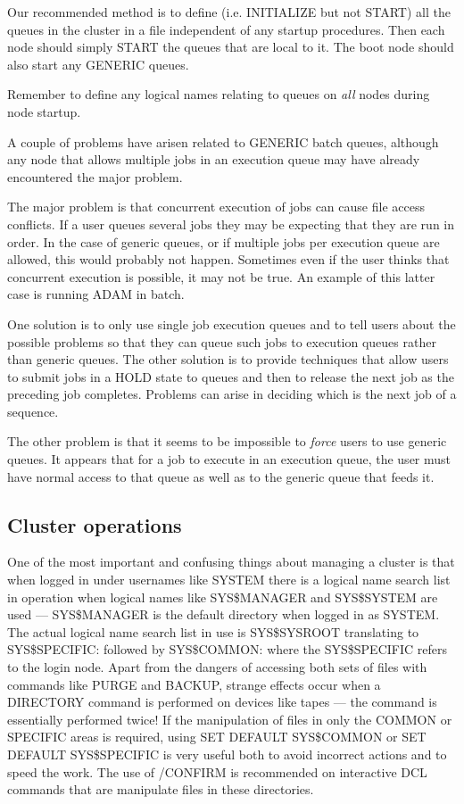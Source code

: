 Our recommended method is to define (i.e. INITIALIZE but not START) all the
queues in the cluster in a file independent of any startup procedures.
Then each node should simply START the queues that are local to it.
The boot node should also start any GENERIC queues.

Remember to define any logical names relating to queues on {\em all} nodes
during node startup.

A couple of problems have arisen related to GENERIC batch queues, although
any node that allows multiple jobs in an execution queue may have already
encountered the major problem.

The major problem is that concurrent execution of jobs can cause file access
conflicts.
If a user queues several jobs they may be expecting that they are run in order.
In the case of generic queues, or if multiple jobs per execution queue are
allowed, this would probably not happen.
Sometimes even if the user thinks that concurrent execution is possible, it
may not be true.
An example of this latter case is running ADAM in batch.

One solution is to only use single job execution queues and to tell users
about the possible problems so that they can queue such jobs to execution
queues rather than generic queues.
The other solution is to provide techniques that allow users to submit jobs
in a HOLD state to queues and then to release the next job as the preceding
job completes.
Problems can arise in deciding which is the next job of a sequence.

The other problem is that it seems to be impossible to {\em force} users to
use generic queues.
It appears that for a job to execute in an execution queue, the user must have
normal access to that queue as well as to the generic queue that feeds it.

\subsection {Cluster operations}

One of the most important and confusing things about managing a cluster is that
when logged in under usernames like SYSTEM there is a logical name search list
in operation when logical names like SYS\$MANAGER and SYS\$SYSTEM are used ---
SYS\$MANAGER is the default directory when logged in as SYSTEM.
The actual logical name search list in use is SYS\$SYSROOT translating to
SYS\$SPECIFIC: followed by SYS\$COMMON: where the SYS\$SPECIFIC refers to
the login node.
Apart from the dangers of accessing both sets of files with commands like PURGE
and BACKUP, strange effects occur when a DIRECTORY command is performed on
devices like tapes --- the command is essentially performed twice!
If the manipulation of files in only the COMMON or SPECIFIC areas is required,
using SET DEFAULT SYS\$COMMON or SET DEFAULT SYS\$SPECIFIC is very useful both
to avoid incorrect actions and to speed the work.
The use of /CONFIRM is recommended on interactive DCL commands that are
manipulate files in these directories.

